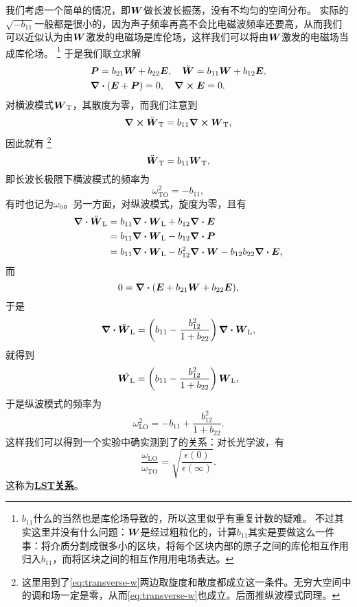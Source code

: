 \documentclass[hyperref, UTF8, a4paper]{ctexart}
\newcommand*{\concept}[1]{\underline{\textbf{#1}}}
\begin{document}
我们考虑一个简单的情况，即$\vb*{W}$做长波长振荡，没有不均匀的空间分布。
实际的$\sqrt{-b_{11}}$一般都是很小的，因为声子频率再高不会比电磁波频率还要高，从而我们可以近似认为由$\vb*{W}$激发的电磁场是库伦场，这样我们可以将由$\vb*{W}$激发的电磁场当成库伦场。%
\footnote{
    $b_{11}$什么的当然也是库伦场导致的，所以这里似乎有重复计数的疑难。
    不过其实这里并没有什么问题：$\vb*{W}$是经过粗粒化的，计算$b_{11}$其实是要做这么一件事：将介质分割成很多小的区块，将每个区块内部的原子之间的库伦相互作用归入$b_{11}$，而将区块之间的相互作用用电场表达。
}%
于是我们联立求解
\[
    \begin{aligned}
        &\vb*{P} = b_{21} \vb*{W} + b_{22} \vb*{E}, \quad \ddot{\vb*{W}} = b_{11} \vb*{W} + b_{12} \vb*{E}, \\
        &\div(\vb*{E} + \vb*{P}) = 0, \quad \curl{\vb*{E}} = 0.
    \end{aligned}
\]
对横波模式$\vb*{W}_\text{T}$，其散度为零，而我们注意到
\[
    \curl{\ddot{\vb*{W}}_\text{T}} = b_{11} \curl{\vb*{W}_\text{T}},
\]
因此就有%
\footnote{
    这里用到了\eqref{eq:transverse-w}两边取旋度和散度都成立这一条件。无穷大空间中的调和场一定是零，从而\eqref{eq:transverse-w}也成立。后面推纵波模式同理。
}%
\begin{equation}
    \ddot{\vb*{W}}_\text{T} = b_{11} \vb*{W}_\text{T},
    \label{eq:transverse-w}
\end{equation}
即长波长极限下横波模式的频率为
\begin{equation}
    \omega_\text{TO}^2 = - b_{11},
\end{equation}
有时也记为$\omega_0$。另一方面，对纵波模式，旋度为零，且有
\[
    \begin{aligned}
        \div{\ddot{\vb*{W}}_\text{L}} &= b_{11} \div{\vb*{W}_\text{L}} + b_{12} \div{\vb*{E}} \\
        &= b_{11} \div{\vb*{W}_\text{L}} - b_{12} \div{\vb*{P}} \\
        &= b_{11} \div{\vb*{W}_\text{L}} - b_{12}^2 \div{\vb*{W}} - b_{12} b_{22} \div{\vb*{E}},
    \end{aligned}
\]
而
\[
    0 = \div{(\vb*{E} + b_{21} \vb*{W} + b_{22} \vb*{E})},
\]
于是
\[
    \div{\ddot{\vb*{W}}_\text{L}} = \left( b_{11} - \frac{b_{12}^2}{1 + b_{22}} \right) \div{\vb*{W}_\text{L}},
\]
就得到
\begin{equation}
    \ddot{\vb*{W}_\text{L}} = \left( b_{11} - \frac{b_{12}^2}{1 + b_{22}} \right) \vb*{W}_\text{L},
\end{equation}
于是纵波模式的频率为
\begin{equation}
    \omega_\text{LO}^2 = -b_{11} + \frac{b_{12}^2}{1 + b_{22}}.
\end{equation}
这样我们可以得到一个实验中确实测到了的关系：对长光学波，有
\begin{equation}
    \frac{\omega_\text{LO}}{\omega_\text{TO}} = \sqrt{\frac{\epsilon(0)}{\epsilon(\infty)}}.
\end{equation}
这称为\concept{LST关系}。
\end{document}
